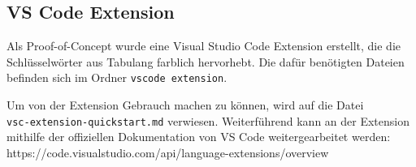 \subsection{VS Code Extension}

Als Proof-of-Concept wurde eine Visual Studio Code Extension erstellt, die die Schlüsselwörter aus Tabulang farblich hervorhebt.
Die dafür benötigten Dateien befinden sich im Ordner \texttt{vscode extension}.

Um von der Extension Gebrauch machen zu können, wird auf die Datei\\
\texttt{vsc-extension-quickstart.md} verwiesen.
Weiterführend kann an der Extension mithilfe der offiziellen Dokumentation von VS Code weitergearbeitet werden: https://code.visualstudio.com/api/language-extensions/overview
